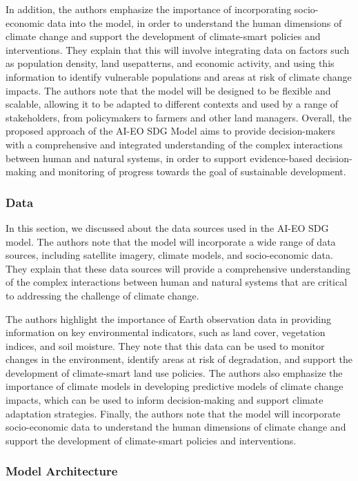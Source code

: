 \documentclass[draft, {\secondLanguage}, english]{volcanica-template}
\begin{document}
In addition, the authors emphasize the importance of incorporating socio-economic data into the model, in order to understand the human dimensions of climate change and support the development of climate-smart policies and interventions. They explain that this will involve integrating data on factors such as population density, land usepatterns, and economic activity, and using this information to identify vulnerable populations and areas at risk of climate change impacts. The authors note that the model will be designed to be flexible and scalable, allowing it to be adapted to different contexts and used by a range of stakeholders, from policymakers to farmers and other land managers. Overall, the proposed approach of the AI-EO SDG Model aims to provide decision-makers with a comprehensive and integrated understanding of the complex interactions between human and natural systems, in order to support evidence-based decision-making and monitoring of progress towards the goal of sustainable development.

\subsubsection{Data}\label{sec:02cb}
In this section, we discussed about the data sources used in the AI-EO SDG model. The authors note that the model will incorporate a wide range of data sources, including satellite imagery, climate models, and socio-economic data. They explain that these data sources will provide a comprehensive understanding of the complex interactions between human and natural systems that are critical to addressing the challenge of climate change.

The authors highlight the importance of Earth observation data in providing information on key environmental indicators, such as land cover, vegetation indices, and soil moisture. They note that this data can be used to monitor changes in the environment, identify areas at risk of degradation, and support the development of climate-smart land use policies. The authors also emphasize the importance of climate models in developing predictive models of climate change impacts, which can be used to inform decision-making and support climate adaptation strategies. Finally, the authors note that the model will incorporate socio-economic data to understand the human dimensions of climate change and support the development of climate-smart policies and interventions.

\subsubsection{Model Architecture}\label{sec:02cc}
\end{document}
